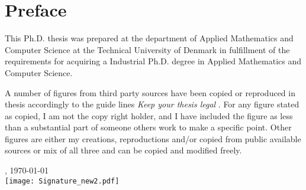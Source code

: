 \chapter{Preface}
This Ph.D. thesis was prepared at the department of Applied Mathematics and Computer Science at the Technical University of Denmark in fulfillment of the requirements for acquiring a Industrial Ph.D. degree in Applied Mathematics and Computer Science.

A number of figures from third party sources have been copied or reproduced in thesis accordingly to the guide lines \textit{Keep your thesis legal} \cite{johnson2015keeping}. For any figure stated as copied, I am not the copy right holder, and I have included the figure as less than a substantial part of someone others work to make a specific point. Other figures are either my creations, reproductions and/or copied from public available sources or mix of all three and can be copied and modified freely.

\vfill

{
\centering
    \thesislocation{}, \today\\[1cm]
    \hspace{3cm}\texttt{[image: Signature\_new2.pdf]}\\[1cm]
\begin{flushright}
    \thesisauthor{}
\end{flushright}
}